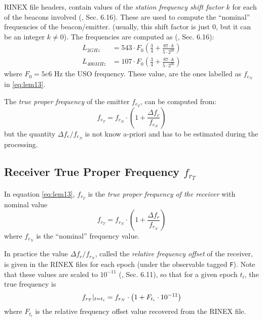 RINEX file headers, contain values of the \emph{station frequency shift 
factor} $k$ for each of the beacons involved (\cite{DORISRNX3}, Sec. 6.16). 
These are used to compute the ``nominal'' frequencies of the beacon/emitter. 
(usually, this shift factor is just $0$, but it can be an integer 
$k \neq 0$). The frequencies are computed as (\cite{DORISRNX3}, Sec. 6.16):
\begin{equation}
  \begin{aligned}
    L_{2GHz}   &= 543 \cdot F_0 \left( \frac{3}{4} + \frac{87\cdot k}{5 \cdot 2^{26}} \right) \\
    L_{400MHz} &= 107 \cdot F_0 \left( \frac{3}{4} + \frac{87\cdot k}{5 \cdot 2^{26}} \right) 
  \end{aligned}
\end{equation}
where $F_0 = 5e6 \text{ Hz}$ the USO frequency. These value, are the ones 
labelled as $f_{e_N}$ in \ref{eq:lem13}.

The \emph{true proper frequency} of the emitter $f_{e_T}$, can be computed 
from:
\begin{equation}
  f_{e_T} = f_{e_N} \cdot \left( 1 + \frac{\Delta f_e}{f_{e_N}} \right)
\end{equation}
but the quantity $\Delta f_e / f_{e_N}$ is not know a-priori and has to be 
estimated during the processing.

\subsection{Receiver True Proper Frequency $f_{r_T}$}
\label{ssec:receiver-true-proper-frequency}
In equation \ref{eq:lem13}, $f_{r_T}$ is the \emph{true proper frequency of 
the receiver} with nominal value 
\begin{equation}
  f_{r_T} = f_{r_N} \cdot \left( 1 + \frac{\Delta f_r}{f_{r_N}} \right)
\end{equation}
where $f_{r_N}$ is the ``nominal'' frequency value.

In practice the value $\Delta f_r / f_{r_N}$, called the \emph{relative 
frequency offset} of the receiver, is given in the RINEX files for each epoch 
(under the observable tagged \texttt{F}). Note that these values are scaled to 
$10^{-11}$ (\cite{DORISRNX3}, Sec. 6.11), so that for a given epoch $t_i$, the 
true frequency is
\begin{equation}
  f_{r_T}|_{t=t_i} = f_{r_N} \cdot \left( 1 + F_{t_i} \cdot 10^{-11} \right)
\end{equation}
where $F_{t_i}$ is the relative frequency offset value recovered from the RINEX 
file.

